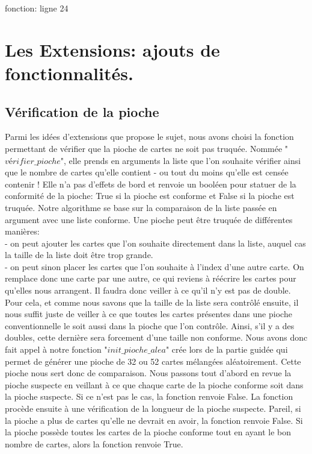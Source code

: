 \documentclass[10pt,a4paper,french,titlepage]{article}
\begin{document}
\caption{fonction: ligne 24}



\section{Les Extensions: ajouts de fonctionnalités.}
\subsection{Vérification de la pioche}
Parmi les idées d'extensions que propose le sujet, nous avons choisi la fonction permettant de vérifier que la pioche de cartes ne soit pas truquée. Nommée "$vérifier\_pioche$", elle prends en arguments la liste que l'on souhaite vérifier ainsi que le nombre de cartes qu'elle contient - ou tout du moins qu'elle est censée contenir ! Elle n'a pas d'effets de bord et renvoie un booléen pour statuer de la conformité de la pioche: True si la pioche est conforme et False si la pioche est truquée. Notre algorithme se base sur la comparaison de la liste passée en argument avec une liste conforme. Une pioche peut être truquée de différentes manières:\\
- on peut ajouter les cartes que l'on souhaite directement dans la liste, auquel cas la taille de la liste doit être trop grande.\\
- on peut sinon placer les cartes que l'on souhaite à l'index d'une autre carte. On remplace donc une carte par une autre, ce qui reviens à réécrire les cartes pour qu'elles nous arrangent. Il faudra donc veiller à ce qu'il n'y est pas de double. Pour cela, et comme nous savons que la taille de la liste sera contrôlé ensuite, il nous suffit juste de veiller à ce que toutes les cartes présentes dans une pioche conventionnelle le soit aussi dans la pioche que l'on contrôle. Ainsi, s'il y a des doubles, cette dernière sera forcement d'une taille non conforme. Nous avons donc fait appel à notre fonction "$init\_pioche\_alea$" crée lors de la partie guidée qui permet de générer une pioche de 32 ou 52 cartes mélangées aléatoirement. Cette pioche nous sert donc de comparaison. Nous passons tout d'abord en revue la pioche suspecte en veillant à ce que chaque carte de la pioche conforme soit dans la pioche suspecte. Si ce n'est pas le cas, la fonction renvoie False. La fonction procède ensuite à une vérification de la longueur de la pioche suspecte. Pareil, si la pioche a plus de cartes qu'elle ne devrait en avoir, la fonction renvoie False. Si la pioche possède toutes les cartes de la pioche conforme tout en ayant le bon nombre de cartes, alors la fonction renvoie True.\\
\end{document}
